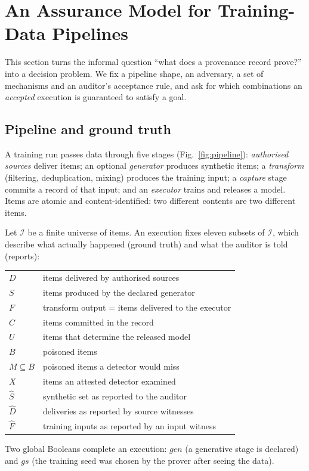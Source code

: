 \section{An Assurance Model for Training-Data Pipelines}\label{sec:model}

This section turns the informal question ``what does a provenance record prove?''
into a decision problem. We fix a pipeline shape, an adversary, a set of mechanisms and
an auditor's acceptance rule, and ask for which combinations an \emph{accepted}
execution is guaranteed to satisfy a goal.

\subsection{Pipeline and ground truth}

A training run passes data through five stages (Fig.~\ref{fig:pipeline}):
\emph{authorised sources} deliver items; an optional \emph{generator} produces synthetic
items; a \emph{transform} (filtering, deduplication, mixing) produces the training input;
a \emph{capture} stage commits a record of that input; and an \emph{executor} trains and
releases a model. Items are atomic and content-identified: two different contents are two
different items.

Let $\mathcal{I}$ be a finite universe of items. An execution fixes eleven subsets of
$\mathcal{I}$, which describe what actually happened (ground truth) and what the auditor
is told (reports):
\begin{center}
\begin{tabular}{@{}ll@{}}
\toprule
$D$ & items delivered by authorised sources\\
$S$ & items produced by the declared generator\\
$F$ & transform output = items delivered to the executor\\
$C$ & items committed in the record\\
$U$ & items that determine the released model\\
$B$ & poisoned items\\
$M\subseteq B$ & poisoned items a detector would miss\\
$X$ & items an attested detector examined\\
$\hat S$ & synthetic set as reported to the auditor\\
$\hat D$ & deliveries as reported by source witnesses\\
$\hat F$ & training inputs as reported by an input witness\\
\bottomrule
\end{tabular}
\end{center}
Two global Booleans complete an execution: $\mathit{gen}$ (a generative stage is declared)
and $\mathit{gs}$ (the training seed was chosen by the prover after seeing the data).

